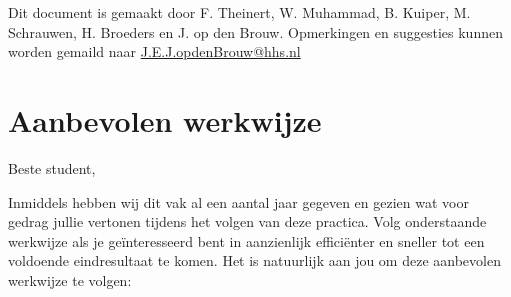 \documentclass[a4paper,10pt,fleqn,twoside]{article}
\begin{document}
\tableofcontents
\vfill
Dit document is gemaakt door F. Theinert, W. Muhammad, B. Kuiper, M. Schrauwen, H. Broeders en J. op den Brouw.
Opmerkingen en suggesties kunnen worden gemaild naar \href{mailto:J.E.J.opdenBrouw@hhs.nl}{J.E.J.opdenBrouw@hhs.nl}



\section*{Aanbevolen werkwijze}

Beste student,

Inmiddels hebben wij dit vak al een aantal jaar gegeven en gezien wat voor gedrag jullie vertonen tijdens het volgen van deze practica. Volg onderstaande werkwijze als je geïnteresseerd bent in aanzienlijk efficiënter en sneller tot een voldoende eindresultaat te komen. Het is natuurlijk aan jou om deze aanbevolen werkwijze te volgen:
\end{document}
